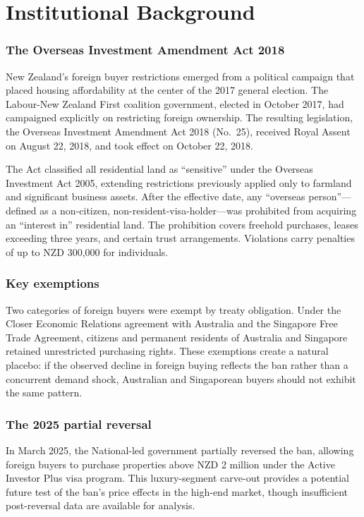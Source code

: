 \documentclass[12pt]{article}
\begin{document}
\section{Institutional Background}

\subsubsection*{The Overseas Investment Amendment Act 2018} New Zealand's foreign buyer restrictions emerged from a political campaign that placed housing affordability at the center of the 2017 general election. The Labour-New Zealand First coalition government, elected in October 2017, had campaigned explicitly on restricting foreign ownership. The resulting legislation, the Overseas Investment Amendment Act 2018 (No.\ 25), received Royal Assent on August 22, 2018, and took effect on October 22, 2018.

The Act classified all residential land as ``sensitive'' under the Overseas Investment Act 2005, extending restrictions previously applied only to farmland and significant business assets. After the effective date, any ``overseas person''---defined as a non-citizen, non-resident-visa-holder---was prohibited from acquiring an ``interest in'' residential land. The prohibition covers freehold purchases, leases exceeding three years, and certain trust arrangements. Violations carry penalties of up to NZD 300,000 for individuals.

\subsubsection*{Key exemptions} Two categories of foreign buyers were exempt by treaty obligation. Under the Closer Economic Relations agreement with Australia and the Singapore Free Trade Agreement, citizens and permanent residents of Australia and Singapore retained unrestricted purchasing rights. These exemptions create a natural placebo: if the observed decline in foreign buying reflects the ban rather than a concurrent demand shock, Australian and Singaporean buyers should not exhibit the same pattern.

\subsubsection*{The 2025 partial reversal} In March 2025, the National-led government partially reversed the ban, allowing foreign buyers to purchase properties above NZD 2 million under the Active Investor Plus visa program. This luxury-segment carve-out provides a potential future test of the ban's price effects in the high-end market, though insufficient post-reversal data are available for analysis.
\end{document}
